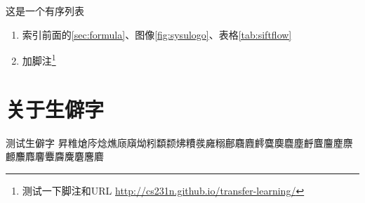 这是一个有序列表
\begin{enumerate}
    \item 索引前面的\autoref{sec:formula}、图像\ref{fig:sysulogo}、表格\ref{tab:siftflow}
    \item 加脚注\footnote{测{试一下}脚注和URL \url{http://cs231n.github.io/transfer-learning/}}
\end{enumerate}

\section{关于生僻字}

测试生僻字
昇䊒熗庈焾燋庼廎㶭粌纇颣炥䊧彂㢕糑鄜麛麚䴫麌䴠麎塵䴣麆麠䴤麖䴨䴩䴪麘麞麡麍麏麐麔	
